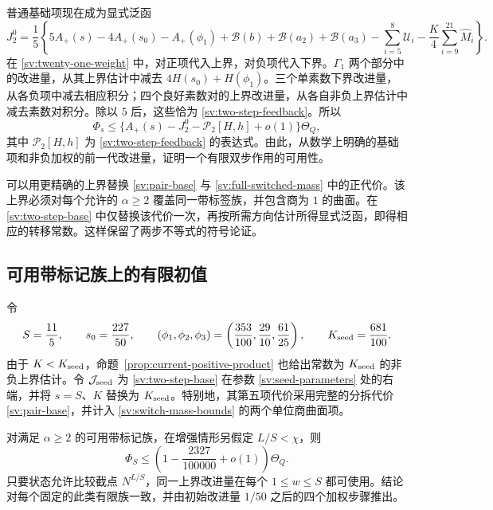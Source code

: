 普通基础项现在成为显式泛函
\begin{equation}\label{sv:two-step-base}
 J_2^0=\frac15\left\{
 5A_+(s)-4A_+(s_0)-A_+(\phi_1)
 +\mathcal B(b)+\mathcal B(a_2)+\mathcal B(a_3)
 -\sum_{i=5}^8\mathcal U_i
 -\frac K4\sum_{i=9}^{21}\widehat M_i\right\}.
\end{equation}
在 \eqref{sv:twenty-one-weight} 中，对正项代入上界，对负项代入下界。$\Gamma_1$ 两个部分中的改进量，从其上界估计中减去 $4H(s_0)+H(\phi_1)$。三个单素数下界改进量，从各负项中减去相应积分；四个良好素数对的上界改进量，从各自非负上界估计中减去素数对积分。除以 $5$ 后，这些恰为 \eqref{sv:two-step-feedback}。所以
\begin{equation}\label{sv:two-step-admissibility}
 \Phi_s\le\{A_+(s)-J_2^0-\mathcal P_2[H,h]+o(1)\}\Theta_Q,
\end{equation}
其中 $\mathcal P_2[H,h]$ 为 \eqref{sv:two-step-feedback} 的表达式。由此，从数学上明确的基础项和非负加权的前一代改进量，证明一个有限双步作用的可用性。

可以用更精确的上界替换 \eqref{sv:pair-base} 与 \eqref{sv:full-switched-mass} 中的正代价。该上界必须对每个允许的 $\alpha\ge2$ 覆盖同一带标签族，并包含商为 $1$ 的曲面。在 \eqref{sv:two-step-base} 中仅替换该代价一次，再按所需方向估计所得显式泛函，即得相应的转移常数。这样保留了两步不等式的符号论证。

\subsection{可用带标记族上的有限初值}

令
\begin{equation}\label{sv:seed-parameters}
 S=\frac{11}{5},\qquad s_0=\frac{227}{50},\qquad
 (\phi_1,\phi_2,\phi_3)
 =\left(\frac{353}{100},\frac{29}{10},\frac{61}{25}\right),
 \qquad K_{\rm seed}=\frac{681}{100}.
\end{equation}
由于 $K<K_{\rm seed}$，命题~\ref{prop:current-positive-product} 也给出常数为 $K_{\rm seed}$ 的非负上界估计。令 $\mathcal J_{\rm seed}$ 为 \eqref{sv:two-step-base} 在参数 \eqref{sv:seed-parameters} 处的右端，并将 $s=S$、$K$ 替换为 $K_{\rm seed}$。特别地，其第五项代价采用完整的分拆代价 \eqref{sv:pair-base}，并计入 \eqref{sv:switch-mass-bounds} 的两个单位商曲面项。

\begin{lemma}[有限初值]\label{sv:finite-seed}
对满足 $\alpha\ge2$ 的可用带标记族，在增强情形另假定 $L/S<\chi$，则
\[
 \Phi_S\le\left(1-\frac{2327}{100000}+o(1)\right)\Theta_Q.
\]
只要状态允许比较截点 $N^{L/S}$，同一上界改进量在每个 $1\le w\le S$ 都可使用。结论对每个固定的此类有限族一致，并由初始改进量 $1/50$ 之后的四个加权步骤推出。
\end{lemma}

